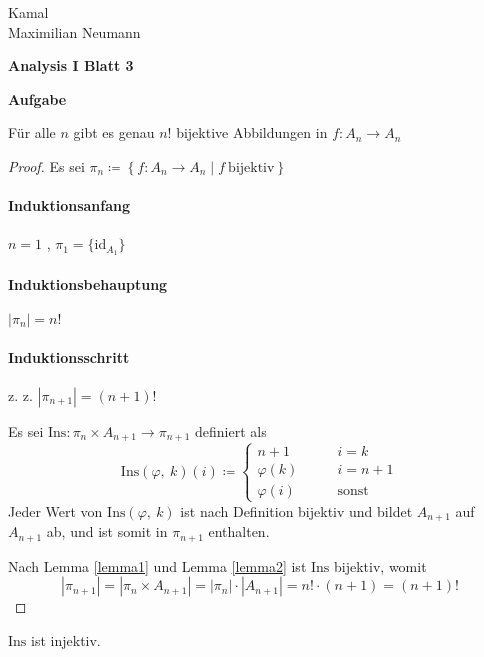\documentclass[a4paper, 12pt]{scrartcl}
\newcounter{taski}
\newcommand{\task}{\stepcounter{taski}\textbf{Aufgabe \arabic{taski}}\\}
\begin{document}
\begin{flushright}
	Kamal\\
	Maximilian Neumann
\end{flushright}
\begin{center}
	\bfseries Analysis I Blatt 3
\end{center}
\task
\begin{theorem}
	Für alle $n$ gibt es genau $n!$ bijektive Abbildungen in $f:A_n \rightarrow A_n$
\end{theorem}
\begin{proof}
Es sei $\pi_n \coloneqq \left\{ f:A_n \rightarrow A_n \mid f\ \text{bijektiv} \right\}$
\paragraph*{Induktionsanfang} $n = 1$ , $\pi_1 = \{ \mathrm{id}_{A_1}\}$
\paragraph*{Induktionsbehauptung} $|\pi_n| = n!$
\paragraph*{Induktionsschritt} z. z. $|\pi_{n+1}| = (n+1)!$

Es sei $\mathrm{Ins}: \pi_n \times A_{n+1} \rightarrow \pi_{n+1}$ definiert als
\[ \mathrm{Ins}(\varphi,\ k)(i) \coloneqq \begin{cases}
	n+1 &\qquad i = k \\
	\varphi(k) &\qquad i = n+1 \\
	\varphi(i) &\qquad \text{sonst}
\end{cases} \]
Jeder Wert von $\mathrm{Ins}(\varphi,\ k)$ ist nach Definition bijektiv und bildet $A_{n+1}$ auf $A_{n+1}$ ab, und ist somit in $\pi_{n+1}$ enthalten.

Nach Lemma \ref{lemma1} und Lemma \ref{lemma2} ist $\mathrm{Ins}$ bijektiv, womit
\[ |\pi_{n+1}| = |\pi_n \times A_{n+1}| = |\pi_n| \cdot |A_{n+1}| = n! \cdot (n+1) = (n+1)! \]
\end{proof}
\begin{lemma}\label{lemma1}
$\mathrm{Ins}$ ist injektiv.
\end{lemma}
\end{document}
